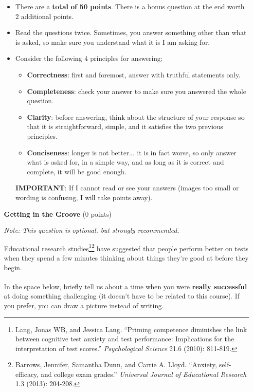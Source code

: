 \documentclass[12pt]{article}
\newenvironment{question}[2][Question]{\begin{trivlist}
\item[\hskip \labelsep {\bfseries #1}\hskip \labelsep {\bfseries #2.}]}{\end{trivlist}}
\begin{document}
\begin{itemize}
    \item There are a \textbf{total of 50 points}. There is a bonus question at the end  worth 2 additional points.
    \item Read the questions twice. Sometimes, you answer something other than what is asked, so make sure you understand what it is I am asking for.
    \item Consider the following 4 principles for answering:
    \begin{itemize}
        \item \textbf{Correctness}: first and foremost, answer with truthful statements only.
        \item \textbf{Completeness}: check your answer to make sure you answered the whole question.
        \item \textbf{Clarity}: before answering, think about the structure of your response so that it is straightforward, simple, and it satisfies the two previous principles.
        \item \textbf{Conciseness}: longer is not better... it is in fact worse, so only answer what is asked for, in a simple way, and as long as it is correct and complete, it will be good enough.
    \end{itemize}

\textbf{IMPORTANT}: If I cannot read or see your answers (images too small or wording is confusing, I will take points away).
\end{itemize}


\clearpage

\begin{question}{0}\textbf{Getting in the Groove} (0 points)
\begin{center}
\textit{Note: This question is optional, but strongly recommended.}
\end{center}
Educational research studies\footnote{\scriptsize{Lang, Jonas WB, and Jessica Lang. ``Priming competence diminishes the link between cognitive test anxiety and test performance: Implications for the interpretation of test scores.'' \textit{Psychological Science} 21.6 (2010): 811-819.}}\footnote{\scriptsize{Barrows, Jennifer, Samantha Dunn, and Carrie A. Lloyd. ``Anxiety, self-efficacy, and college exam grades.'' \textit{Universal Journal of Educational Research} 1.3 (2013): 204-208.}} have suggested that people perform better on tests when they spend a few minutes thinking about things they're good at before they begin.\\\\
In the space below, briefly tell us about a time when you were \textbf{really successful} at doing something challenging (it doesn't have to be related to this course). If you prefer, you can draw a picture instead of writing.\\
\vfill
\hfill
\end{question}
\end{document}
